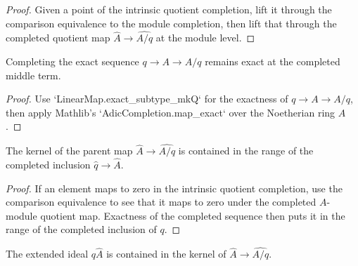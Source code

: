 \begin{proof}
  Given a point of the intrinsic quotient completion, lift it through the
  comparison equivalence to the module completion, then lift that through the
  completed quotient map \( \widehat A\to\widehat{A/q}\) at the module level.
\end{proof}

\begin{lemma}
  \label{lem:quotient_completion_module_exact}
  Completing the exact sequence \(q\to A\to A/q\) remains exact at the completed
  middle term.
\end{lemma}

\begin{proof}
  Use `LinearMap.exact_subtype_mkQ` for the exactness of
  \(q\to A\to A/q\), then apply Mathlib's
  `AdicCompletion.map_exact` over the Noetherian ring \(A\).
\end{proof}

\begin{lemma}
  \label{lem:completed_ring_to_quotient_completion_ker_le_completed_submodule_range}
  The kernel of the parent map
  \(\widehat A\to\widehat{A/q}\) is contained in the range of the completed
  inclusion \(\widehat q\to\widehat A\).
\end{lemma}

\begin{proof}
  If an element maps to zero in the intrinsic quotient completion, use the
  comparison equivalence to see that it maps to zero under the completed
  \(A\)-module quotient map.  Exactness of the completed sequence then puts it
  in the range of the completed inclusion of \(q\).
\end{proof}

\begin{lemma}
  \label{lem:completed_ring_to_quotient_completion_kernel_contains_completed_q}
  The extended ideal \(q\widehat A\) is contained in the kernel of
  \(\widehat A\to\widehat{A/q}\).
\end{lemma}

